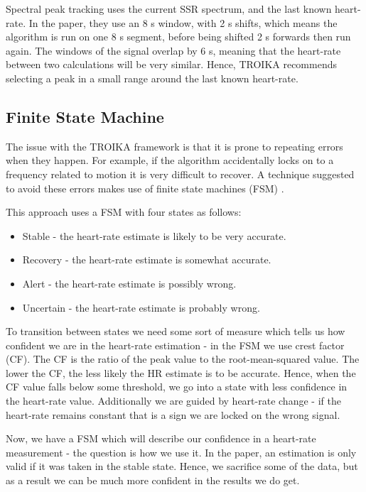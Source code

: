 \documentclass[12pt,a4paper,twoside,openany]{report}
\begin{document}
Spectral peak tracking uses the current SSR spectrum, and the last known
heart-rate. In the paper, they use an 8 s window, with 2 s shifts, which means
the algorithm is run on one 8 s segment, before being shifted 2 s forwards then
run again.
The windows of the signal overlap by 6 s, meaning that the heart-rate
between two calculations will be very similar. Hence, TROIKA recommends
selecting a peak in a small range around the last known heart-rate.

\subsection{Finite State Machine}

The issue with the TROIKA framework is that it is prone to repeating errors
when they happen. For example, if the algorithm accidentally locks on to a frequency
related to motion it is very difficult to recover. A technique
suggested to avoid these errors makes use of finite state machines (FSM)
\cite{Chung19}.

This approach uses a FSM with four states as follows: 

\begin{itemize}
	\item Stable - the heart-rate estimate is likely to be very accurate.
	\item Recovery - the heart-rate estimate is somewhat accurate.
	\item Alert - the heart-rate estimate is possibly wrong.
	\item Uncertain - the heart-rate estimate is probably wrong.
\end{itemize}

To transition between states we need some sort of measure which tells us how
confident we are in the heart-rate estimation - in the FSM we use crest factor
(CF). The CF is the ratio of the peak value to the root-mean-squared value.
The lower the CF, the less likely the HR estimate is to be accurate. Hence,
when the CF value falls below some threshold, we go into a state with less
confidence in the heart-rate value. Additionally we are guided by heart-rate
change - if the heart-rate remains constant that is a sign we are locked on
the wrong signal.

Now, we have a FSM which will describe our confidence in a heart-rate
measurement - the question is how we use it. In the paper, an estimation is
only valid if it was taken in the
stable state. Hence, we sacrifice some of the data, but as a result we can be
much more confident in the results we do get.
\end{document}
